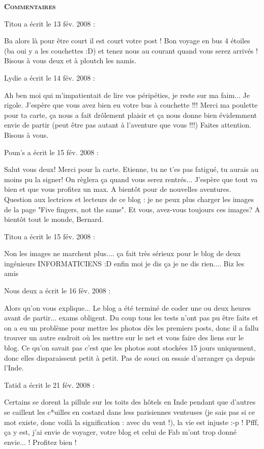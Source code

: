 \bigskip
\textbf{\textsc{Commentaires}}

\medskip
Titou a écrit le 13 fév. 2008 :
\begin{displayquote}
Ba alors là pour être court il est court votre post ! Bon voyage en bus 4 étoiles (ba oui y a les couchettes :D) et tenez nous au courant quand vous serez arrivés ! Bisous à vous deux et à ploutch les namis.
\end{displayquote}

\medskip
Lydie a écrit le 14 fév. 2008 :
\begin{displayquote}
Ah ben moi qui m'impatientait de lire vos péripéties, je reste sur ma faim...
Je rigole.
J'espère que vous avez bien eu votre bus à couchette !!!
Merci ma poulette pour ta carte, ça nous a fait drôlement plaisir et ça nous donne bien évidemment envie de partir (peut être pas autant à l'aventure que vous !!!)
Faites attention.
Bisous à vous.
\end{displayquote}

\medskip
Poun's a écrit le 15 fév. 2008 :
\begin{displayquote}
Salut vous deux! Merci pour la carte. Etienne, tu ne t'es pas fatigué, tu aurais au moins pu la signer! On règlera ça quand vous serez rentrés...
J'espère que tout va bien et que vous profitez un max.
A bientôt pour de nouvelles aventures.
Question aux lectrices et lecteurs de ce blog : je ne peux plus charger les images de la page "Five fingers, not the same". Et vous, avez-vous toujours ces images?
A bientôt tout le monde, Bernard.
\end{displayquote}

\medskip
Titou a écrit le 15 fév. 2008 :
\begin{displayquote}
Non les images ne marchent plus.... ça fait très sérieux pour le blog de deux ingénieurs INFORMATICIENS :D enfin moi je dis ça je ne dis rien.... Biz les amis
\end{displayquote}

\medskip
Nous deux a écrit le 16 fév. 2008 :
\begin{displayquote}
Alors qu'on vous explique...
Le blog a été terminé de coder une ou deux heures avant de partir... exams obligent. Du coup tous les tests n'ont pas pu être faits et on a eu un problème pour mettre les photos dès les premiers posts, donc il a fallu trouver un autre endroit où les mettre sur le net et vous faire des liens sur le blog. Ce qu'on savait pas c'est que les photos sont stockées 15 jours uniquement, donc elles disparaissent petit à petit. Pas de souci on essaie d'arranger ça depuis l'Inde.
\end{displayquote}

\medskip
Tatid a écrit le 21 fév. 2008 :
\begin{displayquote}
Certains se dorent la pillule sur les toits des hôtels en Inde pendant que d'autres se caillent les c*uilles en costard dans less parisiennes venteuses (je sais pas si ce mot existe, donc voilà la signification : avec du vent !), la vie est injuste :-p !
Pfff, ça y est, j'ai envie de voyager, votre blog et celui de Fab m'ont trop donné envie... ! Profitez bien !
\end{displayquote}

\vfill
